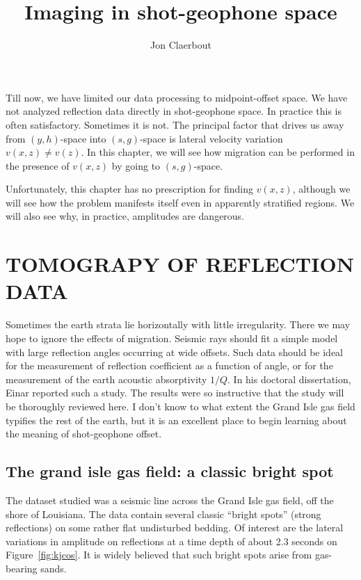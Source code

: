 \title{Imaging in shot-geophone space}
\author{Jon Claerbout}
\maketitle

Till now, we have limited our data processing to midpoint-offset space.
We have not analyzed reflection data directly in shot-geophone space.
In practice this is often satisfactory.
Sometimes it is not.
The principal factor that drives us away from $(y,h)$-space into $(s,g)$-space
is lateral velocity variation $v(x,z) \ne v(z)$.
In this chapter,
we will see how migration can be performed
in the presence of $v(x,z)$
by going to $(s,g)$-space.
\par
Unfortunately, this chapter has no prescription for finding $v(x,z)$,
although we will see how the problem manifests itself
even in apparently stratified regions.
We will also see why, in practice, amplitudes are dangerous.



\section{TOMOGRAPY OF REFLECTION DATA}
\par
Sometimes the earth strata lie horizontally with little irregularity.
There we may hope to ignore the effects of migration.
Seismic rays should fit a simple model with large reflection
angles occurring at wide offsets.
Such data should be ideal for the measurement of reflection
coefficient as a function of angle,
or for the measurement of the earth acoustic absorptivity  $1/Q$.
In his doctoral dissertation, Einar
reported such a study.
The results were so instructive that the study will be thoroughly reviewed here.
I don't know to what extent the Grand Isle gas field typifies
the rest of the earth,
but it is an excellent place to begin learning about the
meaning of shot-geophone offset.
\subsection{The grand isle gas field: a classic bright spot}
\par
The dataset  studied was a seismic line across the Grand Isle
gas field, off the shore of Louisiana.
The data contain several classic ``bright spots'' (strong reflections)
on some rather flat undisturbed bedding.
Of interest are the lateral variations in amplitude
on reflections at a time depth of about 2.3 seconds on Figure~\ref{fig:kjcos}.
It is widely believed that such bright spots
arise from gas-bearing sands.

